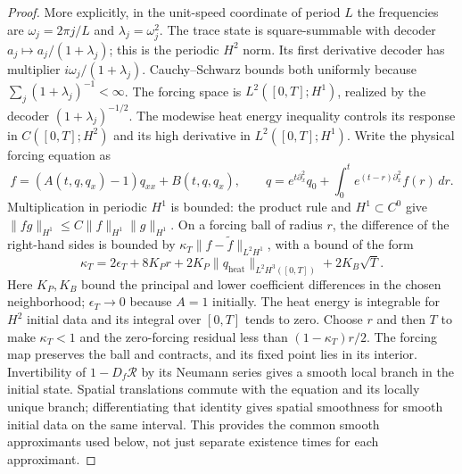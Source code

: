 \begin{proof}
More explicitly, in the unit-speed coordinate of period $L$ the frequencies
are $\omega_j=2\pi j/L$ and $\lambda_j=\omega_j^2$.
The trace state is square-summable with decoder
$a_j\mapsto a_j/(1+\lambda_j)$; this is the periodic $H^2$ norm.
Its first derivative decoder has multiplier
$i\omega_j/(1+\lambda_j)$.  Cauchy--Schwarz bounds both uniformly because
$\sum_j(1+\lambda_j)^{-1}<\infty$.
The forcing space is $L^2([0,T];H^1)$, realized by the decoder
$(1+\lambda_j)^{-1/2}$.  The modewise heat energy inequality controls its
response in $C([0,T];H^2)$ and its high derivative in $L^2([0,T];H^1)$.
Write the physical forcing equation as
\[
 f=(A(t,q,q_x)-1)q_{xx}+B(t,q,q_x),\qquad
 q=e^{t\partial_x^2}q_0+\int_0^te^{(t-r)\partial_x^2}f(r)\,dr.
\]
Multiplication in periodic $H^1$ is bounded: the product rule and
$H^1\subset C^0$ give
$\|fg\|_{H^1}\leq C\|f\|_{H^1}\|g\|_{H^1}$.
On a forcing ball of radius $r$, the difference of the right-hand sides
is bounded by $\kappa_T\|f-\widetilde f\|_{L^2H^1}$, with a bound of the form
\[
 \kappa_T=2\epsilon_T+8K_Pr
       +2K_P\|q_{\mathrm{heat}}\|_{L^2H^3([0,T])}
       +2K_B\sqrt T.
\]
Here $K_P,K_B$ bound the principal and lower coefficient differences in
the chosen neighborhood; $\epsilon_T\to0$ because $A=1$ initially.
The heat energy is integrable for $H^2$ initial data and its integral over
$[0,T]$ tends to zero.  Choose $r$ and then $T$ to make $\kappa_T<1$ and
the zero-forcing residual less than $(1-\kappa_T)r/2$.
The forcing map preserves the ball and contracts, and its fixed point
lies in its interior.  Invertibility of $1-D_f\mathcal R$ by its Neumann
series gives a smooth local branch in the initial state.  Spatial
translations commute with the equation and its locally unique branch;
differentiating that identity gives spatial smoothness for smooth initial
data on the same interval.  This provides the common smooth approximants
used below, not just separate existence times for each approximant.


\end{proof}
